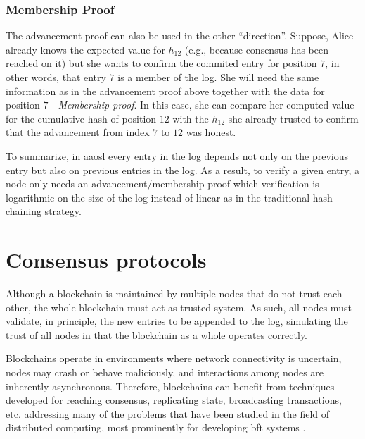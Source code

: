 \subsubsection{Membership Proof}
The advancement proof can also be used in the other ``direction''. Suppose, Alice already knows the expected value for $h_12$ (e.g., because consensus has been reached on it) but she wants to confirm the commited entry for position $7$, in other words, that entry $7$ is a member of the log. She will need the same information as in the advancement proof above together with the data for position $7$ - \textit{Membership proof}. In this case, she can compare her computed value for the cumulative hash of position $12$ with the $h_{12}$ she already trusted to confirm that the advancement from index $7$ to $12$ was honest.

\vspace{5mm}
To summarize, in \gls{aaosl} every entry in the log depends not only on the previous entry but also on previous entries in the log. As a result, to verify a given entry, a node only needs an advancement/membership proof which verification is logarithmic on the size of the log instead of linear as in the traditional hash chaining strategy.



\section{Consensus protocols}

Although a blockchain is maintained by multiple nodes that do not trust each other, the whole blockchain must act as trusted system. As such, all nodes must validate, in principle, the new entries to be appended to the log, simulating the trust of all nodes in that the blockchain as a whole operates correctly.

Blockchains operate in environments where network connectivity is uncertain, nodes may crash or behave maliciously, and interactions among nodes are inherently asynchronous. Therefore, blockchains can benefit from techniques developed for reaching consensus, replicating state, broadcasting transactions, etc. addressing many of the problems that have been studied in the field of distributed computing, most prominently for developing \gls{bft} systems \citep{wild}.

